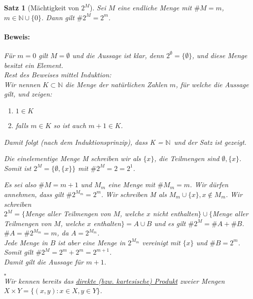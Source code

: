 \documentclass{report}
\newcommand{\N}{\mathbb{N}}
\newcommand{\mN}{$\mathbb{N}$}
\theoremstyle{customrem}
\theoremstyle{customdef}
\newtheorem{satz}[definition]{Satz}
\renewenvironment{proof}{\vspace{-.75cm}\paragraph{Beweis: }}{\vspace{-.5cm}\hfill$\square$}
\begin{document}
	\begin{satz}[Mächtigkeit von $2^M$]
		Sei $M$ eine endliche Menge mit $\#M = m$, $m \in \N \cup \{0\}$. Dann gilt $\#2^M = 2^m$.\\
		\begin{proof}
			Für $m = 0$ gilt $M = \emptyset$ und die Aussage ist klar, denn $2^\emptyset = \{\emptyset\}$, und diese Menge besitzt ein Element.\\
			Rest des Beweises mittel Induktion:\\
			Wir nennen $K \subset \N$ die Menge der natürlichen Zahlen $m$, für welche die Aussage gilt, und zeigen:
			\begin{enumerate}
				\itemsep0cm
				\item $1 \in K$
				\item falls $m \in K$ so ist auch $m + 1 \in K$.
			\end{enumerate}
			Damit folgt (nach dem Induktionsprinzip), dass  K = \mN\ und der Satz ist gezeigt.\\
			\begin{description}[labelindent = 12pt, labelwidth = 1.0cm, leftmargin = 1.0cm]
				\item[Zu 1.:] Die einelementige Menge M schreiben wir als $\{x\}$, die Teilmengen sind $\emptyset, \{x\}$. Somit ist $2^M = \{\emptyset, \{x\}\}$ mit $\#2^M = 2 = 2^1$.
				\item[Zu 2.:] Es sei also $\#M = m + 1$  und $M_m$ eine Menge mit $\# M_m = m$. Wir dürfen annehmen, dass gilt $\#2^{M_m} = 2^m$. Wir schreiben M als $M_m \cup \{x\}, x \not\in M_m$. Wir schreiben\\
				$2^M = \{$Menge aller Teilmengen von $M$, welche $x$ nicht enthalten$\} \cup \{$Menge aller Teilmengen von $M$, welche $x$ enthalten$\} = A \cup B$ und es gilt $\#2^M = \#A + \#B$.\\
				$\#A = \#2^{M_m} = m$, da $A = 2^{M_m}$.\\
				Jede Menge in $B$ ist aber eine Menge in $2^{M_m}$ vereinigt mit $\{x\}$ und $\#B = 2^m$. Somit gilt $\#2^M = 2^m + 2^m = 2^{m + 1}$.\\
				Damit gilt die Aussage für $m + 1$.
			\end{description}
		\end{proof}\\[.25cm]
		Wir kennen bereits das \hyperref[defmengenoperationen]{direkte (bzw. kartesische) Produkt} zweier Mengen $X \times Y = \{(x, y) : x\in X, y \in Y\}$.\\
	\end{satz}
\end{document}
